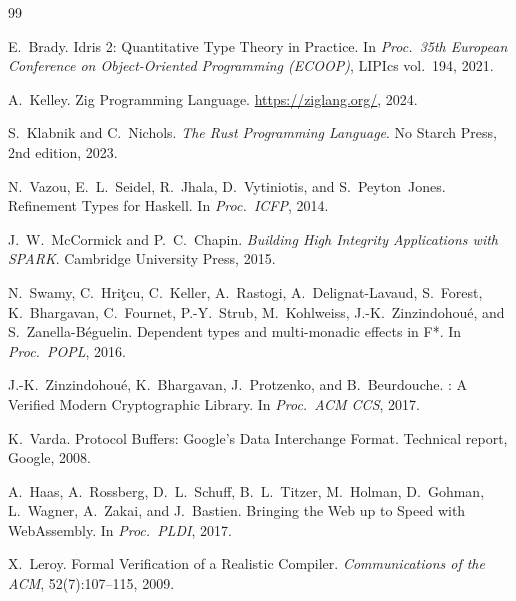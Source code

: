\documentclass[11pt,a4paper]{article}
\begin{document}


\begin{thebibliography}{99}

E.~Brady.
\newblock Idris 2: Quantitative Type Theory in Practice.
\newblock In \textit{Proc.\ 35th European Conference on Object-Oriented
Programming (ECOOP)}, LIPIcs vol.~194, 2021.

A.~Kelley.
\newblock Zig Programming Language.
\newblock \url{https://ziglang.org/}, 2024.

S.~Klabnik and C.~Nichols.
\newblock \textit{The Rust Programming Language}.
\newblock No Starch Press, 2nd edition, 2023.

N.~Vazou, E.~L.~Seidel, R.~Jhala, D.~Vytiniotis, and S.~Peyton~Jones.
\newblock Refinement Types for Haskell.
\newblock In \textit{Proc.\ ICFP}, 2014.

J.~W.~McCormick and P.~C.~Chapin.
\newblock \textit{Building High Integrity Applications with SPARK}.
\newblock Cambridge University Press, 2015.

N.~Swamy, C.~Hri\c{t}cu, C.~Keller, A.~Rastogi, A.~Delignat-Lavaud,
S.~Forest, K.~Bhargavan, C.~Fournet, P.-Y.~Strub, M.~Kohlweiss,
J.-K.~Zinzindohou\'{e}, and S.~Zanella-B\'{e}guelin.
\newblock Dependent types and multi-monadic effects in {F*}.
\newblock In \textit{Proc.\ POPL}, 2016.

J.-K.~Zinzindohou\'{e}, K.~Bhargavan, J.~Protzenko, and B.~Beurdouche.
: A Verified Modern Cryptographic Library.
\newblock In \textit{Proc.\ ACM CCS}, 2017.

K.~Varda.
\newblock Protocol Buffers: Google's Data Interchange Format.
\newblock Technical report, Google, 2008.

A.~Haas, A.~Rossberg, D.~L.~Schuff, B.~L.~Titzer, M.~Holman,
D.~Gohman, L.~Wagner, A.~Zakai, and J.~Bastien.
\newblock Bringing the Web up to Speed with {WebAssembly}.
\newblock In \textit{Proc.\ PLDI}, 2017.

X.~Leroy.
\newblock Formal Verification of a Realistic Compiler.
\newblock \textit{Communications of the ACM}, 52(7):107--115, 2009.


\end{thebibliography}
\end{document}
